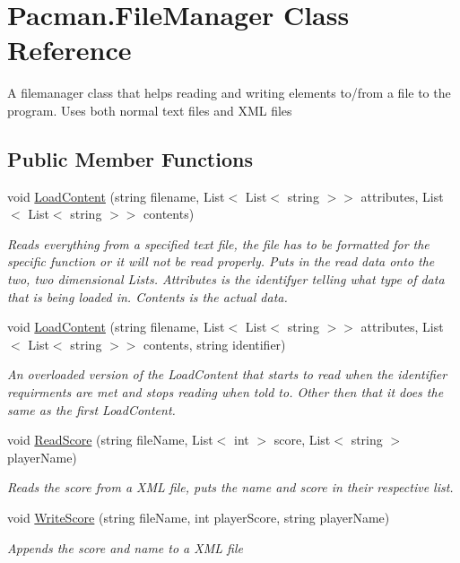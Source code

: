 \hypertarget{class_pacman_1_1_file_manager}{\section{Pacman.\-File\-Manager Class Reference}
\label{class_pacman_1_1_file_manager}
}


A filemanager class that helps reading and writing elements to/from a file to the program. Uses both normal text files and X\-M\-L files  


\subsection*{Public Member Functions}
\begin{DoxyCompactItemize}
\item 
void \hyperlink{class_pacman_1_1_file_manager_a4a5be095e8de90a583f3f99ac89300ff}{Load\-Content} (string filename, List$<$ List$<$ string $>$$>$ attributes, List$<$ List$<$ string $>$$>$ contents)
\begin{DoxyCompactList}\small\item\em Reads everything from a specified text file, the file has to be formatted for the specific function or it will not be read properly. Puts in the read data onto the two, two dimensional Lists. Attributes is the identifyer telling what type of data that is being loaded in. Contents is the actual data. \end{DoxyCompactList}\item 
void \hyperlink{class_pacman_1_1_file_manager_af3b152657eefb8f967dbdd2edca6c7dd}{Load\-Content} (string filename, List$<$ List$<$ string $>$$>$ attributes, List$<$ List$<$ string $>$$>$ contents, string identifier)
\begin{DoxyCompactList}\small\item\em An overloaded version of the Load\-Content that starts to read when the identifier requirments are met and stops reading when told to. Other then that it does the same as the first Load\-Content. \end{DoxyCompactList}\item 
void \hyperlink{class_pacman_1_1_file_manager_a00288173f2ae8a7957797c553b00d760}{Read\-Score} (string file\-Name, List$<$ int $>$ score, List$<$ string $>$ player\-Name)
\begin{DoxyCompactList}\small\item\em Reads the score from a X\-M\-L file, puts the name and score in their respective list. \end{DoxyCompactList}\item 
void \hyperlink{class_pacman_1_1_file_manager_aedf31e50cc3f1f7aba5566e324d139ef}{Write\-Score} (string file\-Name, int player\-Score, string player\-Name)
\begin{DoxyCompactList}\small\item\em Appends the score and name to a X\-M\-L file \end{DoxyCompactList}\end{DoxyCompactItemize}


